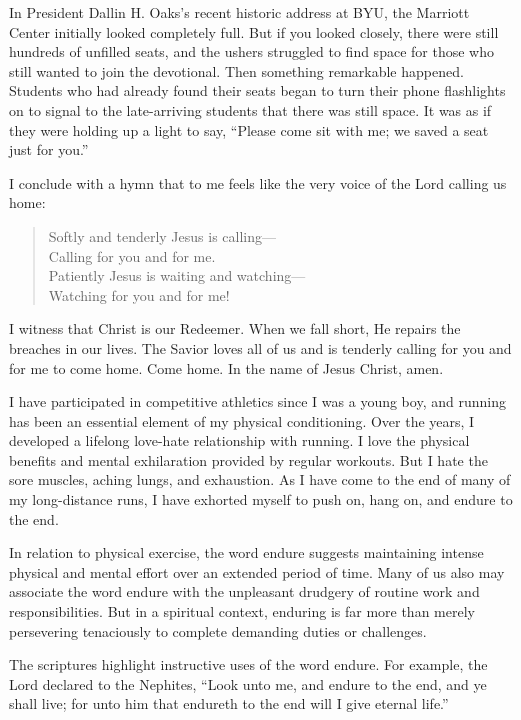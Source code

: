 \documentclass[letterpaper, 11pt]{report}
\newcommand{\speaker}{}
\newcommand{\talk}{}
\newcommand{\talkdatestr}{}
\newcommand{\setspeaker}[1]{\renewcommand{\speaker}{#1}}
\newcommand{\settalk}[1]{\renewcommand{\talk}{#1}}
\newcommand{\talkheading}[2]{%
    \vspace{1em}
    \noindent{\huge\bfseries #1}
    \par\nopagebreak\vspace{0.25em}
    \noindent{\normalsize\bfseries #2\ifx\talkdatestr\empty\else,\ \talkdatestr\fi}
    \par\nopagebreak\vspace{0.5em}
}
\begin{document}
In President Dallin H. Oaks’s recent historic address at BYU, the Marriott Center initially looked completely full. But if you looked closely, there were still hundreds of unfilled seats, and the ushers struggled to find space for those who still wanted to join the devotional. Then something remarkable happened. Students who had already found their seats began to turn their phone flashlights on to signal to the late-arriving students that there was still space. It was as if they were holding up a light to say, “Please come sit with me; we saved a seat just for you.”

I conclude with a hymn that to me feels like the very voice of the Lord calling us home:

\begin{verse}
Softly and tenderly Jesus is calling—\\
Calling for you and for me.\\
Patiently Jesus is waiting and watching—\\
Watching for you and for me!
\end{verse}

I witness that Christ is our Redeemer. When we fall short, He repairs the breaches in our lives. The Savior loves all of us and is tenderly calling for you and for me to come home. Come home. In the name of Jesus Christ, amen.

\newpage
\settalk{All Who Have Endured Valiantly}
\setspeaker{David A. Bednar}
\talkheading{All Who Have Endured Valiantly}{David A. Bednar}

I have participated in competitive athletics since I was a young boy, and running has been an essential element of my physical conditioning. Over the years, I developed a lifelong love-hate relationship with running. I love the physical benefits and mental exhilaration provided by regular workouts. But I hate the sore muscles, aching lungs, and exhaustion. As I have come to the end of many of my long-distance runs, I have exhorted myself to push on, hang on, and endure to the end.

In relation to physical exercise, the word endure suggests maintaining intense physical and mental effort over an extended period of time. Many of us also may associate the word endure with the unpleasant drudgery of routine work and responsibilities. But in a spiritual context, enduring is far more than merely persevering tenaciously to complete demanding duties or challenges.

The scriptures highlight instructive uses of the word endure. For example, the Lord declared to the Nephites, “Look unto me, and endure to the end, and ye shall live; for unto him that endureth to the end will I give eternal life.”
\end{document}
